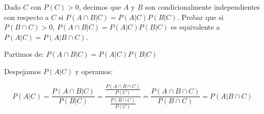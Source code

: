 
\begin{problem}[13] Dado $C$ con $P(C) > 0$, decimos que $A$ y $B$ son condicionalmente independientes
con respecto a $C$ si $P(A\cap B|C) =P(A|C) P(B|C)$. Probar que si  $P(B\cap C) > 0$, 
$P(A\cap B|C) =P(A|C) P(B|C)$ es equivalente a $P(A|C) = P(A|B \cap C)$. 


\solution

\begin{expla}
Partimos de: $P(A\cap B|C)=P(A|C)P(B|C)$  

Despejamos $P(A|C)$ y operamos:
\end{expla}

\[
P(A|C)=\frac{P(A\cap B|C)}{P(B|C)}=\frac{\frac{P(A\cap B\cap C)}{P(C)}}{\frac{P(B \cap C)}{P(C)}}=\frac{P(A \cap B\cap C)}{P(B\cap C)}=P(A|B\cap C)
\]

\end{problem}


